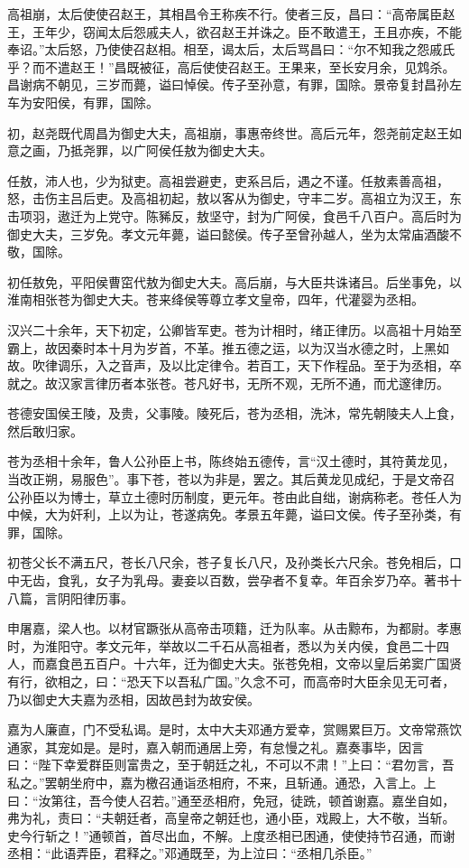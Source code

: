 \documentclass[]{article}
\begin{document}
高祖崩，太后使使召赵王，其相昌令王称疾不行。使者三反，昌曰：``高帝属臣赵王，王年少，窃闻太后怨戚夫人，欲召赵王并诛之。臣不敢遣王，王且亦疾，不能奉诏。''太后怒，乃使使召赵相。相至，谒太后，太后骂昌曰：``尔不知我之怨戚氏乎？而不遣赵王！''昌既被征，高后使使召赵王。王果来，至长安月余，见鸩杀。昌谢病不朝见，三岁而薨，谥曰悼侯。传子至孙意，有罪，国除。景帝复封昌孙左车为安阳侯，有罪，国除。

初，赵尧既代周昌为御史大夫，高祖崩，事惠帝终世。高后元年，怨尧前定赵王如意之画，乃抵尧罪，以广阿侯任敖为御史大夫。

任敖，沛人也，少为狱吏。高祖尝避吏，吏系吕后，遇之不谨。任敖素善高祖，怒，击伤主吕后吏。及高祖初起，敖以客从为御史，守丰二岁。高祖立为汉王，东击项羽，遨迁为上党守。陈豨反，敖坚守，封为广阿侯，食邑千八百户。高后时为御史大夫，三岁免。孝文元年薨，谥曰懿侯。传子至曾孙越人，坐为太常庙酒酸不敬，国除。

初任敖免，平阳侯曹窋代敖为御史大夫。高后崩，与大臣共诛诸吕。后坐事免，以淮南相张苍为御史大夫。苍来绛侯等尊立孝文皇帝，四年，代灌婴为丞相。

汉兴二十余年，天下初定，公卿皆军吏。苍为计相时，绪正律历。以高祖十月始至霸上，故因秦时本十月为岁首，不革。推五德之运，以为汉当水德之时，上黑如故。吹律调乐，入之音声，及以比定律令。若百工，天下作程品。至于为丞相，卒就之。故汉家言律历者本张苍。苍凡好书，无所不观，无所不通，而尤邃律历。

苍德安国侯王陵，及贵，父事陵。陵死后，苍为丞相，洗沐，常先朝陵夫人上食，然后敢归家。

苍为丞相十余年，鲁人公孙臣上书，陈终始五德传，言``汉土德时，其符黄龙见，当改正朔，易服色''。事下苍，苍以为非是，罢之。其后黄龙见成纪，于是文帝召公孙臣以为博士，草立土德时历制度，更元年。苍由此自绌，谢病称老。苍任人为中候，大为奸利，上以为让，苍遂病免。孝景五年薨，谥曰文侯。传子至孙类，有罪，国除。

初苍父长不满五尺，苍长八尺余，苍子复长八尺，及孙类长六尺余。苍免相后，口中无齿，食乳，女子为乳母。妻妾以百数，尝孕者不复幸。年百余岁乃卒。著书十八篇，言阴阳律历事。

申屠嘉，梁人也。以材官蹶张从高帝击项籍，迁为队率。从击黥布，为都尉。孝惠时，为淮阳守。孝文元年，举故以二千石从高祖者，悉以为关内侯，食邑二十四人，而嘉食邑五百户。十六年，迁为御史大夫。张苍免相，文帝以皇后弟窦广国贤有行，欲相之，曰：``恐天下以吾私广国。''久念不可，而高帝时大臣余见无可者，乃以御史大夫嘉为丞相，因故邑封为故安侯。

嘉为人廉直，门不受私谒。是时，太中大夫邓通方爱幸，赏赐累巨万。文帝常燕饮通家，其宠如是。是时，嘉入朝而通居上旁，有怠慢之礼。嘉奏事毕，因言曰：``陛下幸爱群臣则富贵之，至于朝廷之礼，不可以不肃！''上曰：``君勿言，吾私之。''罢朝坐府中，嘉为檄召通诣丞相府，不来，且斩通。通恐，入言上。上曰：``汝第往，吾今使人召若。''通至丞相府，免冠，徒跣，顿首谢嘉。嘉坐自如，弗为礼，责曰：``夫朝廷者，高皇帝之朝廷也，通小臣，戏殿上，大不敬，当斩。史今行斩之！''通顿首，首尽出血，不解。上度丞相已困通，使使持节召通，而谢丞相：``此语弄臣，君释之。''邓通既至，为上泣曰：``丞相几杀臣。''
\end{document}
